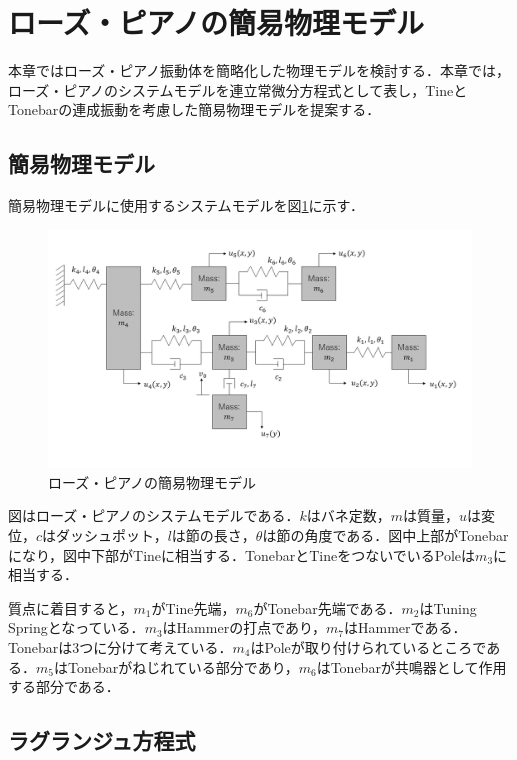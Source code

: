 \section{ローズ・ピアノの簡易物理モデル}

本章ではローズ・ピアノ振動体を簡略化した物理モデルを検討する．本章では，ローズ・ピアノのシステムモデルを連立常微分方程式として表し，TineとTonebarの連成振動を考慮した簡易物理モデルを提案する．

\subsection{簡易物理モデル}

簡易物理モデルに使用するシステムモデルを図\ref{fig:簡易モデル}に示す．

\begin{figure}
    \centering
    \includegraphics[width=15cm]{img/system-model.png}
    \caption{ローズ・ピアノの簡易物理モデル}
    \label{fig:簡易モデル}
\end{figure}

図はローズ・ピアノのシステムモデルである．$k$はバネ定数，$m$は質量，$u$は変位，$c$はダッシュポット，$l$は節の長さ，$\theta$は節の角度である．図中上部がTonebarになり，図中下部がTineに相当する．TonebarとTineをつないでいるPoleは$m_3$に相当する．

質点に着目すると，$m_1$がTine先端，$m_6$がTonebar先端である．$m_2$はTuning Springとなっている．$m_3$はHammerの打点であり，$m_7$はHammerである．Tonebarは3つに分けて考えている．$m_4$はPoleが取り付けられているところである．$m_5$はTonebarがねじれている部分であり，$m_6$はTonebarが共鳴器として作用する部分である．



\subsection{ラグランジュ方程式}

